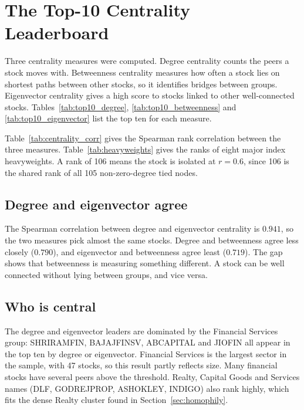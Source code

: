 \documentclass[12pt,a4paper]{report}
\begin{document}
\section{The Top-10 Centrality Leaderboard}

Three centrality measures were computed. Degree centrality counts the peers a stock moves with. Betweenness centrality measures how often a stock lies on shortest paths between other stocks, so it identifies bridges between groups. Eigenvector centrality gives a high score to stocks linked to other well-connected stocks. Tables~\ref{tab:top10_degree}, \ref{tab:top10_betweenness} and \ref{tab:top10_eigenvector} list the top ten for each measure.





Table~\ref{tab:centrality_corr} gives the Spearman rank correlation between the three measures.
Table~\ref{tab:heavyweights} gives the ranks of eight major index heavyweights. A rank of 106 means the stock is isolated at $r=0.6$, since 106 is the shared rank of all 105 non-zero-degree tied nodes.




\subsection*{Degree and eigenvector agree}
The Spearman correlation between degree and eigenvector centrality is $0.941$, so the two measures pick almost the same stocks. Degree and betweenness agree less closely ($0.790$), and eigenvector and betweenness agree least ($0.719$). The gap shows that betweenness is measuring something different. A stock can be well connected without lying between groups, and vice versa.

\subsection*{Who is central}
The degree and eigenvector leaders are dominated by the Financial Services group: SHRIRAMFIN, BAJAJFINSV, ABCAPITAL and JIOFIN all appear in the top ten by degree or eigenvector. Financial Services is the largest sector in the sample, with 47 stocks, so this result partly reflects size. Many financial stocks have several peers above the threshold. Realty, Capital Goods and Services names (DLF, GODREJPROP, ASHOKLEY, INDIGO) also rank highly, which fits the dense Realty cluster found in Section~\ref{sec:homophily}. 
\end{document}
